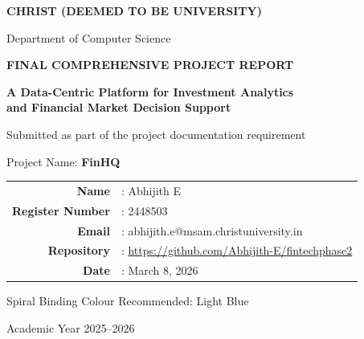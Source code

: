 \documentclass[12pt,a4paper]{report}
\makeatletter
\newcommand{\projecttitle}{A Data-Centric Platform for Investment Analytics\\and Financial Market Decision Support}
\newcommand{\projectshort}{FinHQ}
\newcommand{\studentname}{Abhijith E}
\newcommand{\regno}{2448503}
\newcommand{\studentmail}{abhijith.e@msam.christuniversity.in}
\newcommand{\reportdate}{March 8, 2026}
\newcommand{\repolink}{https://github.com/Abhijith-E/fintechphase2}
\makeatother
\begin{document}
\begin{titlepage}
\thispagestyle{empty}
\centering
\vspace*{0.55in}
{\fontsize{16}{18}\selectfont\bfseries CHRIST (DEEMED TO BE UNIVERSITY)\par}
\vspace{0.08in}
{\fontsize{12}{14}\selectfont Department of Computer Science\par}
\vspace{0.4in}
{\fontsize{16}{18}\selectfont\bfseries FINAL COMPREHENSIVE PROJECT REPORT\par}
\vspace{0.3in}
{\fontsize{16}{18}\selectfont\bfseries \projecttitle\par}
\vspace{0.28in}
{\fontsize{12}{14}\selectfont Submitted as part of the project documentation requirement\par}
\vspace{0.25in}
{\fontsize{12}{14}\selectfont Project Name: \textbf{\projectshort}\par}
\vspace{0.3in}
\begin{tabular}{rl}
\textbf{Name} & : \studentname \\
\textbf{Register Number} & : \regno \\
\textbf{Email} & : \studentmail \\
\textbf{Repository} & : \url{\repolink} \\
\textbf{Date} & : \reportdate \\
\end{tabular}
\vfill
{\fontsize{12}{14}\selectfont Spiral Binding Colour Recommended: Light Blue\par}
\vspace{0.2in}
{\fontsize{12}{14}\selectfont Academic Year 2025--2026\par}
\end{titlepage}
\end{document}
